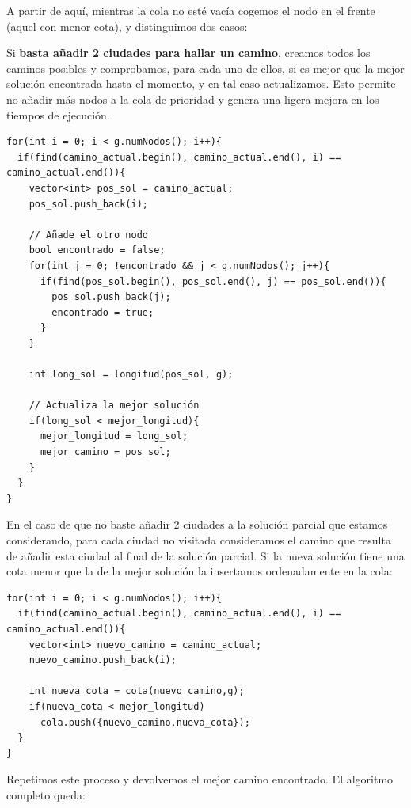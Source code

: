 A partir de aquí, mientras la cola no esté vacía cogemos el nodo en el frente (aquel con menor cota), y distinguimos dos casos:

Si \textbf{basta añadir 2 ciudades para hallar un camino}, creamos todos los caminos posibles y comprobamos, para cada uno de ellos, si es mejor que la mejor solución encontrada hasta el momento, y en tal caso actualizamos. Esto permite no añadir más nodos a la cola de prioridad y genera una ligera mejora en los tiempos de ejecución.

\begin{lstlisting}
for(int i = 0; i < g.numNodos(); i++){
  if(find(camino_actual.begin(), camino_actual.end(), i) == camino_actual.end()){
    vector<int> pos_sol = camino_actual;
    pos_sol.push_back(i);

    // Añade el otro nodo
    bool encontrado = false;
    for(int j = 0; !encontrado && j < g.numNodos(); j++){
      if(find(pos_sol.begin(), pos_sol.end(), j) == pos_sol.end()){
        pos_sol.push_back(j);
        encontrado = true;
      }
    }

    int long_sol = longitud(pos_sol, g);

    // Actualiza la mejor solución
    if(long_sol < mejor_longitud){
      mejor_longitud = long_sol;
      mejor_camino = pos_sol;
    }
  }
}
\end{lstlisting}

En el caso de que no baste añadir 2 ciudades a la solución parcial que estamos considerando, para cada ciudad no visitada consideramos el camino que resulta de añadir esta ciudad al final de la solución parcial. Si la nueva solución tiene una cota menor que la de la mejor solución la insertamos ordenadamente en la cola:

\begin{lstlisting}
for(int i = 0; i < g.numNodos(); i++){
  if(find(camino_actual.begin(), camino_actual.end(), i) == camino_actual.end()){
    vector<int> nuevo_camino = camino_actual;
    nuevo_camino.push_back(i);

    int nueva_cota = cota(nuevo_camino,g);
    if(nueva_cota < mejor_longitud)
      cola.push({nuevo_camino,nueva_cota});
  }
}
\end{lstlisting}

Repetimos este proceso y devolvemos el mejor camino encontrado. El algoritmo completo queda:


